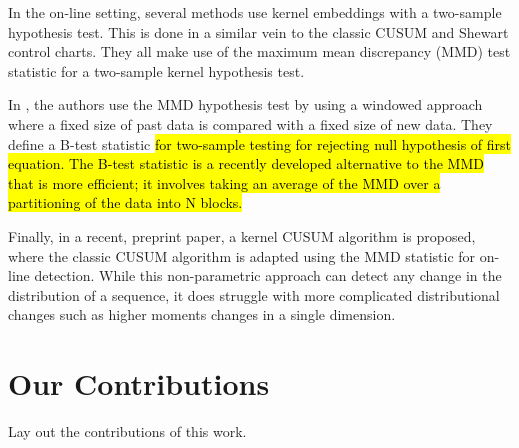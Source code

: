 In the on-line setting, several methods use kernel embeddings with a two-sample hypothesis test. This is done in a similar vein to the classic CUSUM and Shewart control charts. They all make use of the maximum mean discrepancy (MMD) test statistic for a two-sample kernel hypothesis test. 


In  \cite{li2015m}, the authors use the MMD hypothesis test by using a windowed approach where a fixed size of past data is compared with a fixed size of new data. They define a B-test statistic \hl{for two-sample testing for rejecting null hypothesis of first equation. The B-test statistic is a recently developed alternative to the MMD that is more efficient; it involves taking an average of the MMD over a partitioning of the data into N blocks.}%

Finally, in a recent, preprint paper, a kernel CUSUM algorithm is proposed, where the classic CUSUM algorithm is adapted using the MMD statistic for on-line detection. While this non-parametric approach can detect any change in the distribution of a sequence, it does struggle with more complicated distributional changes such as higher moments changes in a single dimension.

 

\section{Our Contributions}
Lay out the contributions of this work.